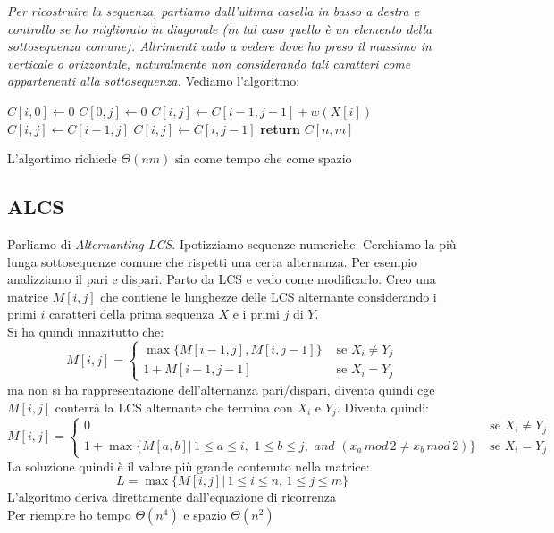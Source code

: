 \documentclass[a4paper,12pt, oneside]{book}
\begin{document}
\textit{Per ricostruire la sequenza, partiamo dall’ultima casella in
  basso a destra e controllo se ho migliorato in diagonale (in tal
  caso quello è un elemento della sottosequenza comune). Altrimenti
  vado a vedere dove ho preso il massimo in verticale o orizzontale,
  naturalmente non considerando tali caratteri come appartenenti alla
  sottosequenza.}
Vediamo l'algoritmo:
\begin{algorithm}
  \begin{algorithmic}
    \State $C[i,0]\gets 0$
    \EndFor
    \State $C[0,j]\gets 0$
    \EndFor
    \State $C[i,j]\gets C[i-1,j-1]+w(X[i])$
    \Else
    \State $C[i,j]\gets C[i-1,j]$
    \State $C[i,j]\gets C[i, j-1]$
    \EndIf
    \EndIf
    \EndFor
    \EndFor
    \State \textbf{return} $C[n,m]$
    \EndFunction
  \end{algorithmic}
\end{algorithm}
L'algortimo richiede $\Theta(nm)$ sia come tempo che come spazio
\subsection{ALCS}
Parliamo di \textit{Alternanting LCS}. Ipotizziamo sequenze
numeriche. Cerchiamo la più lunga sottosequenze comune che rispetti
una certa alternanza. Per esempio analizziamo il pari e dispari.
Parto da LCS e vedo come modificarlo. Creo una matrice $M[i,j]$ che
contiene le lunghezze delle LCS alternante considerando i primi $i$
caratteri della prima sequenza $X$ e i primi $j$ di $Y$.\\
Si ha quindi innazitutto che:
\[ M[i,j]=
  \begin{cases}
    \max\{M[i-1,j], M[i,j-1]\} & \mbox{ se } X_i\neq Y_j\\
    1+M[i-1,j-1] & \mbox{ se } X_i=Y_j
  \end{cases}
\]
ma non si ha rappresentazione dell'alternanza pari/dispari, diventa
quindi cge $M[i,j]$ conterrà la LCS alternante che termina con  $X_i$
e $Y_j$. Diventa quindi:
\[ M[i,j]=
  \begin{cases}
    0 & \mbox{ se } X_i\neq Y_j\\
    1+\max\{M[a,b]|\, 1\leq a \leq i,\,\,1\leq b\leq j,\,\,and\,\,
    (x_a\,mod\, 2 \neq x_b\,mod\, 2)\} & \mbox{ se } X_i=Y_j
  \end{cases}
\]
La soluzione quindi è il valore più grande contenuto nella matrice:
\[L=\max\{M[i,j]|\,1\leq i\leq n,\, 1\leq j\leq m\}\]
L'algoritmo deriva direttamente dall'equazione di ricorrenza\\
Per riempire ho tempo $\Theta(n^4)$ e spazio $\Theta(n^2)$
\end{document}
